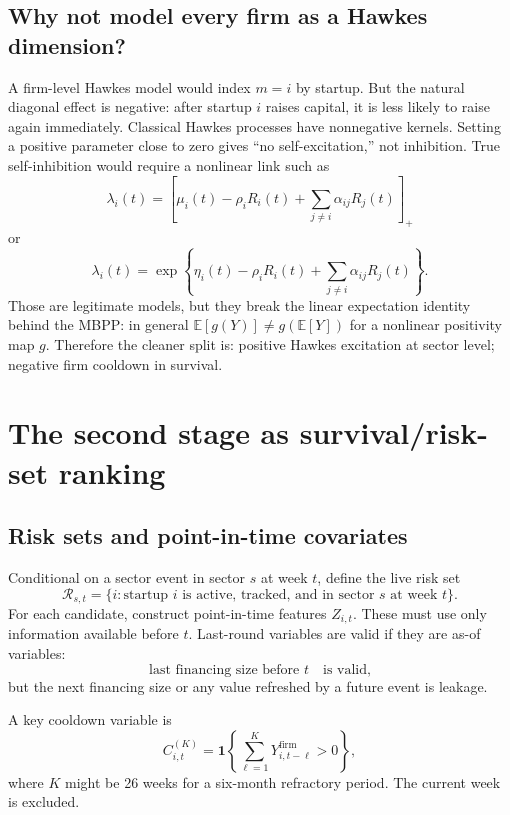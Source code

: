 \documentclass[11pt]{article}
\theoremstyle{plain}
\theoremstyle{definition}
\theoremstyle{remark}
\newcommand{\E}{\mathbb{E}}
\newcommand{\cR}{\mathcal{R}}
\newcommand{\one}{\mathbf{1}}
\begin{document}
\subsection{Why not model every firm as a Hawkes dimension?}
A firm-level Hawkes model would index $m=i$ by startup. But the natural diagonal effect is negative: after startup $i$ raises capital, it is less likely to raise again immediately. Classical Hawkes processes have nonnegative kernels. Setting a positive parameter close to zero gives ``no self-excitation,'' not inhibition. True self-inhibition would require a nonlinear link such as
\begin{equation}
\lambda_i(t)=\left[\mu_i(t)-\rho_i R_i(t)+\sum_{j\ne i}\alpha_{ij}R_j(t)\right]_+
\end{equation}
or
\begin{equation}
\lambda_i(t)=\exp\left\{\eta_i(t)-\rho_iR_i(t)+\sum_{j\ne i}\alpha_{ij}R_j(t)\right\}.
\end{equation}
Those are legitimate models, but they break the linear expectation identity behind the MBPP: in general $\E[g(Y)]\ne g(\E[Y])$ for a nonlinear positivity map $g$. Therefore the cleaner split is: positive Hawkes excitation at sector level; negative firm cooldown in survival.

\section{The second stage as survival/risk-set ranking}
\label{sec:survival}

\subsection{Risk sets and point-in-time covariates}
Conditional on a sector event in sector $s$ at week $t$, define the live risk set
\begin{equation}
\cR_{s,t}=\{i:\text{startup }i\text{ is active, tracked, and in sector }s\text{ at week }t\}.
\end{equation}
For each candidate, construct point-in-time features $Z_{i,t}$. These must use only information available before $t$. Last-round variables are valid if they are as-of variables:
\[
\text{last financing size before }t \quad \text{is valid,}
\]
but the next financing size or any value refreshed by a future event is leakage.

A key cooldown variable is
\begin{equation}
C^{(K)}_{i,t}=\one\left\{\sum_{\ell=1}^{K}Y^{\mathrm{firm}}_{i,t-\ell}>0\right\},
\label{eq:cooldown}
\end{equation}
where $K$ might be 26 weeks for a six-month refractory period. The current week is excluded.
\end{document}
